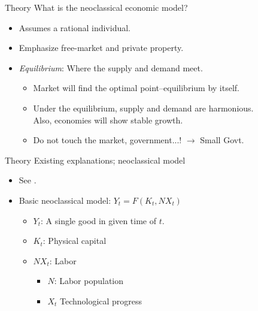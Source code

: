 \documentclass[xcolor=dvipsnames, t]{beamer}
\begin{document}
	\begin{frame}[fragile]{Theory}
		What is the neoclassical economic model?\pause
		\begin{itemize}
			\item Assumes a rational individual.
			\item Emphasize free-market and private property.\pause
			\item \textit{Equilibrium}: Where the supply and demand meet.\pause
			\begin{itemize}
				\item Market will find the optimal point--equilibrium by itself.
				\item Under the equilibrium, supply and demand are harmonious.\\Also, economies will show stable growth.
				\item Do not touch the market, government...! $\rightarrow$ Small Govt.
			\end{itemize}
		\end{itemize}
	\end{frame}
	
	\begin{frame}[fragile]{Theory}
		Existing explanations; neoclassical model
		\begin{itemize}
			\item See \citet[S129-S133]{king:rebelo:1990}. \pause
			\item Basic neoclassical model: \pause $Y_t = F(K_{t}, NX_{t})$ \pause
			\begin{itemize}
				\item $Y_t$: A single good in given time of $t$.
				\item $K_{t}$: Physical capital
				\item $NX_{t}$: Labor \pause
				\begin{itemize}
					\item $N$: Labor population
					\item $X_t$ Technological progress
				\end{itemize}
			\end{itemize}
		\end{itemize}
	\end{frame}
	
\end{document}
